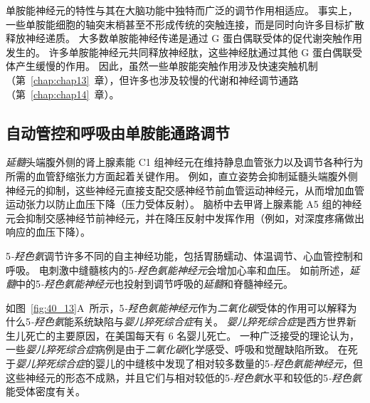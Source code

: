 单胺能神经元的特性与其在大脑功能中独特而广泛的调节作用相适应。
事实上，一些单胺能细胞的轴突末梢甚至不形成传统的突触连接，而是同时向许多目标扩散释放神经递质。
大多数单胺能神经传递是通过 G 蛋白偶联受体的促代谢突触作用发生的。
许多单胺能神经元共同释放神经肽，这些神经肽通过其他 G 蛋白偶联受体产生缓慢的作用。
因此，虽然一些单胺能突触作用涉及快速突触机制（第~\ref{chap:chap13}~章），但许多也涉及较慢的代谢和神经调节通路（第~\ref{chap:chap14}~章）。



\subsection{自动管控和呼吸由单胺能通路调节}

\textit{延髓}头端腹外侧的肾上腺素能 C1 组神经元在维持静息血管张力以及调节各种行为所需的血管舒缩张力方面起着关键作用。
例如，直立姿势会抑制延髓头端腹外侧神经元的抑制，这些神经元直接支配交感神经节前血管运动神经元，从而增加血管运动张力以防止血压下降（压力受体反射）。
脑桥中去甲肾上腺素能 A5 组的神经元会抑制交感神经节前神经元，并在降压反射中发挥作用（例如，对深度疼痛做出响应的血压下降）。


5\textit{-羟色氨}调节许多不同的自主神经功能，包括胃肠蠕动、体温调节、心血管控制和呼吸。
电刺激中缝髓核内的5\textit{-羟色氨能神经元}会增加心率和血压。
如前所述，\textit{延髓}中的5\textit{-羟色氨能神经元}也投射到调节呼吸的\textit{延髓}和脊髓神经元。


如图~\ref{fig:40_13}A~所示，5\textit{-羟色氨能神经元}作为\textit{二氧化碳}受体的作用可以解释为什么5\textit{-羟色氨}能系统缺陷与\textit{婴儿猝死综合症}有关。
\textit{婴儿猝死综合症}是西方世界新生儿死亡的主要原因，在美国每天有 6 名婴儿死亡。
一种广泛接受的理论认为，一些\textit{婴儿猝死综合症}病例是由于\textit{二氧化碳}化学感受、呼吸和觉醒缺陷所致。
在死于\textit{婴儿猝死综合症}的婴儿的中缝核中发现了相对较多数量的5\textit{-羟色氨能神经元}，但这些神经元的形态不成熟，并且它们与相对较低的5\textit{-羟色氨}水平和较低的5\textit{-羟色氨}能受体密度有关。


